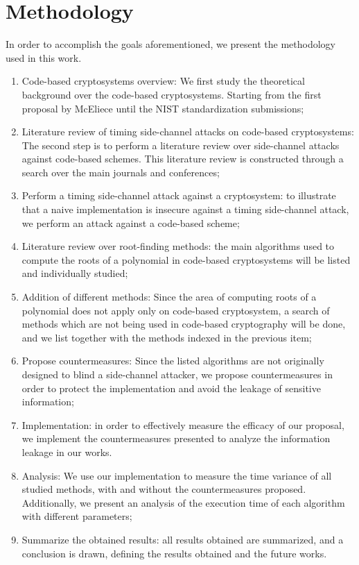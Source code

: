 \section{Methodology}
In order to accomplish the goals aforementioned, we present the methodology used in this work.
\begin{enumerate}
    \item Code-based cryptosystems overview: We first study the theoretical background over the code-based cryptosystems. Starting from the first proposal by McEliece until the NIST standardization submissions;
    \item Literature review of timing side-channel attacks on code-based cryptosystems: The second step is to perform a literature review over side-channel attacks against code-based schemes. This literature review is constructed through a search over the main journals and conferences;
    \item Perform a timing side-channel attack against a cryptosystem: to illustrate that a naive implementation is insecure against a timing side-channel attack, we perform an attack against a code-based scheme;
    \item Literature review over root-finding methods: the main algorithms used to compute the roots of a polynomial in code-based cryptosystems will be listed and individually studied; 
    \item Addition of different methods: Since the area of computing roots of a polynomial does not apply only on code-based cryptosystem, a search of methods which are not being used in code-based cryptography will be done, and we list together with the methods indexed in the previous item;
    \item Propose countermeasures: Since the listed algorithms are not originally designed to blind a side-channel attacker, we propose countermeasures in order to protect the implementation and avoid the leakage of sensitive information;
    \item Implementation: in order to effectively measure the efficacy of our proposal, we implement the countermeasures presented to analyze the information leakage in our works.
    \item Analysis: We use our implementation to measure the time variance of all studied methods, with and without the countermeasures proposed. Additionally, we present an analysis of the execution time of each algorithm with different parameters;
    \item Summarize the obtained results: all results obtained are summarized, and a conclusion is drawn, defining the results obtained and the future works.
\end{enumerate}

